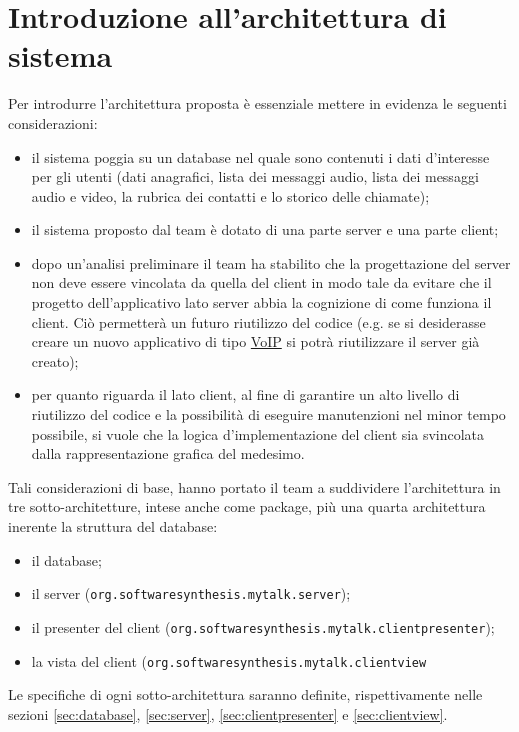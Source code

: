 \section{Introduzione all'architettura di sistema}\label{sec:introdesign}
Per introdurre l'architettura proposta è essenziale mettere in evidenza le seguenti considerazioni:
\begin{itemize}
	\item il sistema poggia su un database nel quale sono contenuti i dati d'interesse per gli utenti (dati anagrafici, lista dei messaggi audio, lista dei messaggi audio e video, la rubrica dei contatti e lo storico delle chiamate);
	\item il sistema proposto dal team è dotato di una parte server e una parte client;
	\item dopo un'analisi preliminare il team ha stabilito che la progettazione del server non deve essere vincolata da quella del client in modo tale da evitare che il progetto dell'applicativo lato server abbia la cognizione di come funziona il client. Ciò permetterà un futuro riutilizzo del codice (e.g. se si desiderasse creare un nuovo applicativo di tipo \underline{VoIP} si potrà riutilizzare il server già creato);
	\item per quanto riguarda il lato client, al fine di garantire un alto livello di riutilizzo del codice e la possibilità di eseguire manutenzioni nel minor tempo possibile, si vuole che la logica d'implementazione del client sia svincolata dalla rappresentazione grafica del medesimo.
\end{itemize}

Tali considerazioni di base, hanno portato il team a suddividere l'architettura in tre sotto-architetture, intese anche come package, più una quarta architettura inerente la struttura del database:
\begin{itemize}
	\item il database;
	\item il server (\texttt{org.softwaresynthesis.mytalk.server});
	\item il presenter del client (\texttt{org.softwaresynthesis.mytalk.clientpresenter});
	\item la vista del client (\texttt{org.softwaresynthesis.mytalk.clientview}
\end{itemize}

Le specifiche di ogni sotto-architettura saranno definite, rispettivamente nelle sezioni \vref{sec:database}, \vref{sec:server}, \vref{sec:clientpresenter} e \vref{sec:clientview}.

